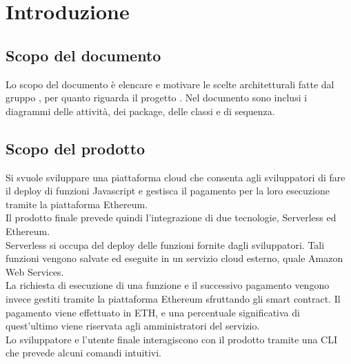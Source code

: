 \section{Introduzione}
\subsection{Scopo del documento}
	Lo scopo del documento è elencare e motivare le scelte architetturali fatte dal gruppo \Gruppo{}, per quanto riguarda il progetto \NomeProgetto{}. Nel documento sono inclusi i diagrammi delle attività, dei package, delle classi e di sequenza.
\subsection{Scopo del prodotto}
	Si svuole sviluppare una piattaforma cloud che consenta agli sviluppatori di fare il deploy di funzioni Javascript e gestisca il pagamento per la loro esecuzione tramite la piattaforma Ethereum.\\
	Il prodotto finale prevede quindi l'integrazione di due tecnologie, Serverless ed Ethereum.\\
	Serverless si occupa del deploy delle funzioni fornite dagli sviluppatori. Tali funzioni vengono salvate ed eseguite in un servizio cloud esterno, quale Amazon Web Services.  \\La richiesta di esecuzione di una funzione e il successivo pagamento vengono invece gestiti tramite la piattaforma Ethereum sfruttando gli smart contract. Il pagamento viene effettuato in ETH, e una percentuale significativa di quest'ultimo viene riservata agli amministratori del servizio. \\
	Lo sviluppatore e l'utente finale interagiscono con il prodotto tramite una CLI che prevede alcuni comandi intuitivi.
